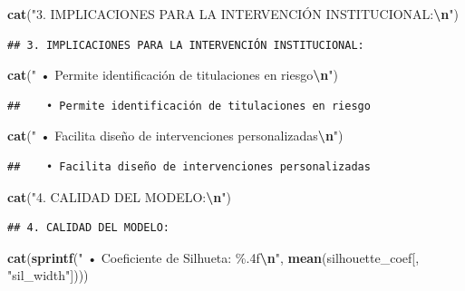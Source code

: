 \documentclass[
]{article}
\newenvironment{Shaded}{\begin{snugshade}}{\end{snugshade}}
\newcommand{\FunctionTok}[1]{\textcolor[rgb]{0.13,0.29,0.53}{\textbf{#1}}}
\newcommand{\NormalTok}[1]{#1}
\newcommand{\SpecialCharTok}[1]{\textcolor[rgb]{0.81,0.36,0.00}{\textbf{#1}}}
\newcommand{\StringTok}[1]{\textcolor[rgb]{0.31,0.60,0.02}{#1}}
\begin{document}
\begin{Shaded}
\begin{Highlighting}[]
\FunctionTok{cat}\NormalTok{(}\StringTok{"3. IMPLICACIONES PARA LA INTERVENCIÓN INSTITUCIONAL:}\SpecialCharTok{\textbackslash{}n}\StringTok{"}\NormalTok{)}
\end{Highlighting}
\end{Shaded}

\begin{verbatim}
## 3. IMPLICACIONES PARA LA INTERVENCIÓN INSTITUCIONAL:
\end{verbatim}

\begin{Shaded}
\begin{Highlighting}[]
\FunctionTok{cat}\NormalTok{(}\StringTok{"   • Permite identificación de titulaciones en riesgo}\SpecialCharTok{\textbackslash{}n}\StringTok{"}\NormalTok{)}
\end{Highlighting}
\end{Shaded}

\begin{verbatim}
##    • Permite identificación de titulaciones en riesgo
\end{verbatim}

\begin{Shaded}
\begin{Highlighting}[]
\FunctionTok{cat}\NormalTok{(}\StringTok{"   • Facilita diseño de intervenciones personalizadas}\SpecialCharTok{\textbackslash{}n}\StringTok{"}\NormalTok{)}
\end{Highlighting}
\end{Shaded}

\begin{verbatim}
##    • Facilita diseño de intervenciones personalizadas
\end{verbatim}

\begin{Shaded}
\begin{Highlighting}[]
\FunctionTok{cat}\NormalTok{(}\StringTok{"4. CALIDAD DEL MODELO:}\SpecialCharTok{\textbackslash{}n}\StringTok{"}\NormalTok{)}
\end{Highlighting}
\end{Shaded}

\begin{verbatim}
## 4. CALIDAD DEL MODELO:
\end{verbatim}

\begin{Shaded}
\begin{Highlighting}[]
\FunctionTok{cat}\NormalTok{(}\FunctionTok{sprintf}\NormalTok{(}\StringTok{"   • Coeficiente de Silhueta: \%.4f}\SpecialCharTok{\textbackslash{}n}\StringTok{"}\NormalTok{, }\FunctionTok{mean}\NormalTok{(silhouette\_coef[, }\StringTok{"sil\_width"}\NormalTok{])))}
\end{Highlighting}
\end{Shaded}
\end{document}
